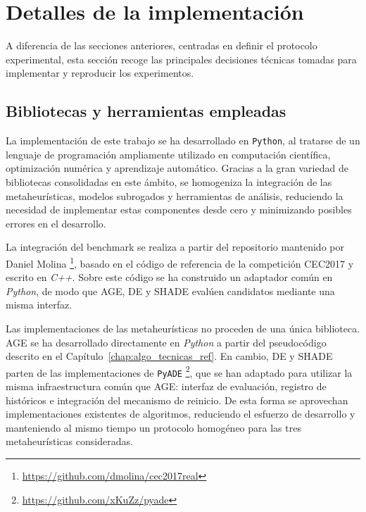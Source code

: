\section{Detalles de la implementación}
\label{sec:detalles_implementacion}


A diferencia de las secciones anteriores, centradas en definir el protocolo experimental, esta sección recoge las principales decisiones técnicas tomadas para implementar y reproducir los experimentos.


\subsection{Bibliotecas y herramientas empleadas}

La implementación de este trabajo se ha desarrollado en \texttt{Python}, al tratarse de un lenguaje de programación ampliamente utilizado en computación científica, optimización numérica y aprendizaje automático. Gracias a la gran variedad de bibliotecas consolidadas en este ámbito, se homogeniza la integración de las metaheurísticas, modelos subrogados y herramientas de análisis, reduciendo la necesidad de implementar estas componentes desde cero y minimizando posibles errores en el desarrollo.


La integración del benchmark se realiza a partir del repositorio mantenido por Daniel Molina%
\footnote{\url{https://github.com/dmolina/cec2017real}}, basado en el código de referencia de la competición CEC2017 y escrito en \textit{C++}. Sobre este código se ha construido un adaptador común en \textit{Python}, de modo que AGE, DE y SHADE evalúen candidatos mediante una misma interfaz.

Las implementaciones de las metaheurísticas no proceden de una única biblioteca. AGE se ha desarrollado directamente en \textit{Python} a partir del pseudocódigo descrito en el Capítulo~\ref{chap:algo_tecnicas_ref}. En cambio, DE y SHADE parten de las implementaciones de \texttt{PyADE}%
\footnote{\url{https://github.com/xKuZz/pyade}}, que se han adaptado para utilizar la misma infraestructura común que AGE: interfaz de evaluación, registro de históricos e integración del mecanismo de reinicio. De esta forma se aprovechan implementaciones existentes de algoritmos, reduciendo el esfuerzo de desarrollo y manteniendo al mismo tiempo un protocolo homogéneo para las tres metaheurísticas consideradas.


